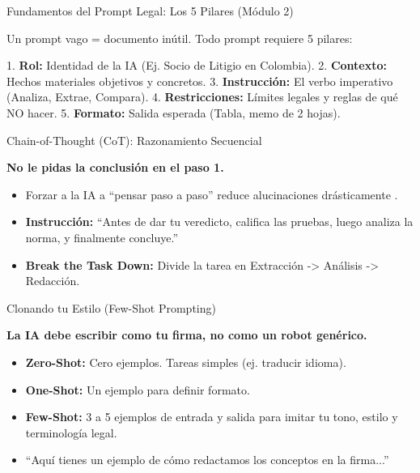 \documentclass[aspectratio=169]{beamer}
\begin{document}
\begin{frame}[fragile]{Fundamentos del Prompt Legal: Los 5 Pilares (Módulo 2)}


Un prompt vago = documento inútil. Todo prompt requiere 5 pilares:

1. \textbf{Rol:} Identidad de la IA (Ej. Socio de Litigio en Colombia).
2. \textbf{Contexto:} Hechos materiales objetivos y concretos.
3. \textbf{Instrucción:} El verbo imperativo (Analiza, Extrae, Compara).
4. \textbf{Restricciones:} Límites legales y reglas de qué NO hacer.
5. \textbf{Formato:} Salida esperada (Tabla, memo de 2 hojas).

\end{frame}



\begin{frame}[fragile]{Chain-of-Thought (CoT): Razonamiento Secuencial}


\textbf{No le pidas la conclusión en el paso 1.}

\begin{itemize}
  \item Forzar a la IA a ``pensar paso a paso'' reduce alucinaciones drásticamente \cite{openai2023}.
  \item \textbf{Instrucción:} ``Antes de dar tu veredicto, califica las pruebas, luego analiza la norma, y finalmente concluye.''
  \item \textbf{Break the Task Down:} Divide la tarea en Extracción -> Análisis -> Redacción.
\end{itemize}
\end{frame}



\begin{frame}[fragile]{Clonando tu Estilo (Few-Shot Prompting)}


\textbf{La IA debe escribir como tu firma, no como un robot genérico.}

\begin{itemize}
  \item \textbf{Zero-Shot:} Cero ejemplos. Tareas simples (ej. traducir idioma).
  \item \textbf{One-Shot:} Un ejemplo para definir formato.
  \item \textbf{Few-Shot:} 3 a 5 ejemplos de entrada y salida para imitar tu tono, estilo y terminología legal.
  \item ``Aquí tienes un ejemplo de cómo redactamos los conceptos en la firma...''
\end{itemize}
\end{frame}
\end{document}
